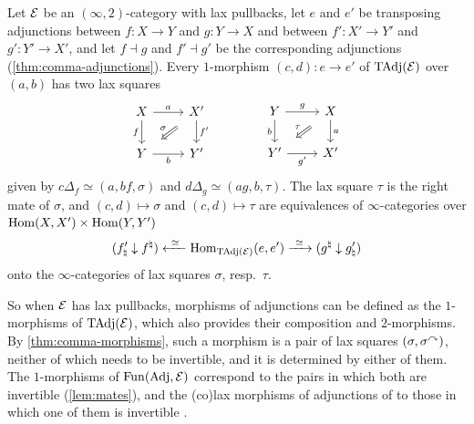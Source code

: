 \begin{thm}
\label{thm:comma-morphisms}
%
Let $\mathcal{E}$ be an $(\infty,2)$-category with lax pullbacks, let $e$ and $e'$ be
transposing adjunctions between $f\colon X \to Y$ and $g\colon Y \to X$ and
between $f'\colon X' \to Y'$ and $g'\colon Y' \to X'$,
and let $f \dashv g$ and $f' \dashv g'$ be the corresponding adjunctions
(\cref{thm:comma-adjunctions}).
Every $1$-morphism $(c,d)\colon e \to e'$ of $\mathrm{TAdj}(\mathcal{E})$ over $(a,b)$ has two
lax squares
\begin{equation*}
\begin{tikzcd}
X \ar[r, "a"] \ar[d, "f"'] & X' \ar[d, "f'"] \ar[dl, Rightarrow, shorten=3mm,
"\sigma"'] \\
Y \ar[r, "b"'] & Y'
\end{tikzcd}
\qquad\qquad
\begin{tikzcd}
Y \ar[r, "g"] \ar[d, "b"'] & X \ar[d, "a"] \ar[dl, Rightarrow, shorten=3mm,
"\tau"'] \\
Y' \ar[r, "g'"'] & X'
\end{tikzcd}
\end{equation*}
given by
$c\Delta_{f} \simeq (a,bf,\sigma)$
and
$d\Delta_{g} \simeq (ag,b,\tau)$.
The lax square $\tau$ is the right mate of $\sigma$,
and $(c,d) \mapsto \sigma$ and $(c,d) \mapsto \tau$ are equivalences of
$\infty$-categories over
$\operatorname{Hom}(X,X') \times \operatorname{Hom}(Y,Y')$
\begin{equation*}
(f'_{\natural} \downarrow f^{\natural}) \xleftarrow{\ \simeq\ }
\operatorname{Hom}_{\mathrm{TAdj}(\mathcal{E})}(e,e') \xrightarrow{\ \simeq\ } (g^{\natural} \downarrow
g'_{\natural})
\end{equation*}
onto the $\infty$-categories of lax squares $\sigma$, resp.\ $\tau$.
\end{thm}

%
So when $\mathcal{E}$ has lax pullbacks, morphisms of adjunctions can be defined as the
$1$-morphisms of
$\mathrm{TAdj}(\mathcal{E})$, which also provides their composition and $2$-morphisms.
By \cref{thm:comma-morphisms}, such a morphism is a pair of lax squares
$(\sigma,{\sigma}^{\curvearrowright})$,
neither of which needs to be invertible, and it is determined by either of them.
The $1$-morphisms of $\operatorname{Fun}(\mathrm{Adj},\mathcal{E})$ correspond to the pairs in which both are
invertible (\cref{lem:mates}), and the (co)lax morphisms of adjunctions of
\cite[Def.~4.2]{haugseng2021laxmonads} to those in which one of them is
invertible \cite[Cor.~4.8, 4.9]{haugseng2021laxmonads}.

